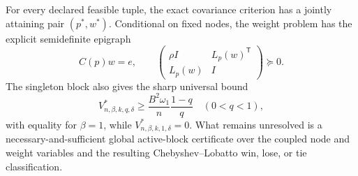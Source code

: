 For every declared feasible tuple, the exact covariance criterion has a jointly attaining pair \((p^*,w^*)\).  Conditional on fixed nodes, the weight problem has the explicit semidefinite epigraph
\[
C(p)w=e,
\qquad
\begin{pmatrix}
\rho I&L_p(w)^{\mathsf T}\\
L_p(w)&I
\end{pmatrix}\succeq0.
\]
The singleton block also gives the sharp universal bound
\[
V^*_{n,\beta,k,q,\delta}\ge
\frac{B^2\omega_1}{n}\frac{1-q}{q}
\quad(0<q<1),
\]
with equality for \(\beta=1\), while \(V^*_{n,\beta,k,1,\delta}=0\).  What remains unresolved is a necessary-and-sufficient global active-block certificate over the coupled node and weight variables and the resulting Chebyshev--Lobatto win, lose, or tie classification.